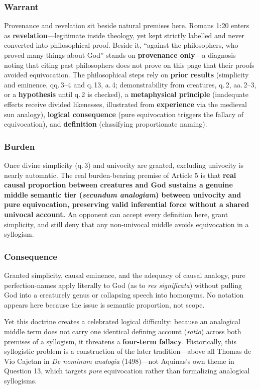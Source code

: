 \subsubsection*{Warrant}

Provenance and revelation sit beside natural premises here. Romans 1:20 enters as \textbf{revelation}---legitimate inside theology, yet kept strictly labelled and never converted into philosophical proof. Beside it, ``against the philosophers, who proved many things about God'' stands on \textbf{provenance only}---a diagnosis noting that citing past philosophers does not prove on this page that their proofs avoided equivocation. The philosophical steps rely on \textbf{prior results} (simplicity and eminence, qq.\,3--4 and q.\,13, a.\,4; demonstrability from creatures, q.\,2, aa.\,2--3, or a \textbf{hypothesis} until q.\,2 is checked), a \textbf{metaphysical principle} (inadequate effects receive divided likenesses, illustrated from \textbf{experience} via the medieval sun analogy), \textbf{logical consequence} (pure equivocation triggers the fallacy of equivocation), and \textbf{definition} (classifying proportionate naming).

\subsubsection*{Burden}

Once divine simplicity (q.\,3) and univocity are granted, excluding univocity is nearly automatic. The real burden-bearing premise of Article 5 is that \textbf{real causal proportion between creatures and God sustains a genuine middle semantic tier (\emph{secundum analogiam}) between univocity and pure equivocation, preserving valid inferential force without a shared univocal account.} An opponent can accept every definition here, grant simplicity, and still deny that any non-univocal middle avoids equivocation in a syllogism.

\subsubsection*{Consequence}

Granted simplicity, causal eminence, and the adequacy of causal analogy, pure perfection-names apply literally to God (as to \emph{res significata}) without pulling God into a creaturely genus or collapsing speech into homonyms. No notation appears here because the issue is semantic proportion, not scope.

Yet this doctrine creates a celebrated logical difficulty: because an analogical middle term does not carry one identical defining account (\emph{ratio}) across both premises of a syllogism, it threatens a \textbf{four-term fallacy}. Historically, this syllogistic problem is a construction of the later tradition---above all Thomas de Vio Cajetan in \emph{De nominum analogia} (1498)---not Aquinas's own theme in Question 13, which targets \emph{pure} equivocation rather than formalizing analogical syllogisms.


